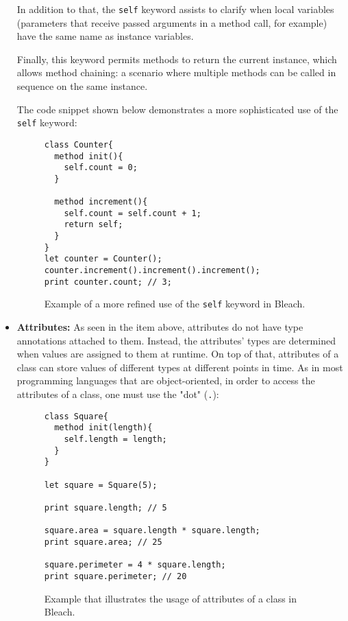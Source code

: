 \begin{itemize}
    In addition to that, the \texttt{self} keyword assists to clarify when local variables (parameters that receive passed arguments in a method call, for example) have the same name as instance variables.

    Finally, this keyword permits methods to return the current instance, which allows method chaining: a scenario where multiple methods can be called in sequence on the same instance.

    The code snippet shown below demonstrates a more sophisticated use of the \texttt{self} keyword:
\begin{figure}[H]
    \centering
    \begin{lstlisting}
class Counter{
  method init(){
    self.count = 0;
  }

  method increment(){
    self.count = self.count + 1;
    return self;
  }
}
let counter = Counter();
counter.increment().increment().increment();
print counter.count; // 3;
    \end{lstlisting}
    \caption{Example of a more refined use of the \texttt{self} keyword in Bleach.}
\end{figure}
    
    \item \textbf{Attributes:} As seen in the item above, attributes do not have type annotations attached to them. Instead, the attributes' types are determined when values are assigned to them at runtime. On top of that, attributes of a class can store values of different types at different points in time. As in most programming languages that are object-oriented, in order to access the attributes of a class, one must use the "dot" (\texttt{.}):
\begin{figure}[H]
    \centering
    \begin{lstlisting}
class Square{
  method init(length){
    self.length = length;
  }
}

let square = Square(5);

print square.length; // 5

square.area = square.length * square.length;
print square.area; // 25

square.perimeter = 4 * square.length;
print square.perimeter; // 20
    \end{lstlisting}
    \caption{Example that illustrates the usage of attributes of a class in Bleach.}
\end{figure}


\end{itemize}
